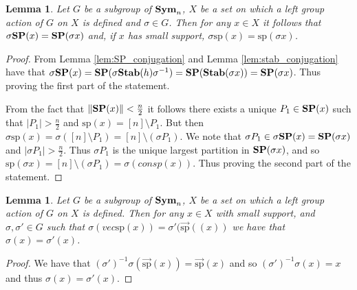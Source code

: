 \documentclass[12pt]{report}
\newtheorem{lem}[thm]{Lemma} \newtheorem{prop}[thm]{Proposition}
\newcommand{\stab}{\text{\textbf{Stab}}}
\newcommand{\sym}{\text{\textbf{Sym}}}
\newcommand{\orb}{\text{\textbf{Orb}}}
\newcommand{\SP}{\text{\textbf{SP}}}
\newcommand{\consp}{\text{sp}}
\begin{document}
\begin{lem}
  \label{lem:support_mapping}
  Let $G $ be a subgroup of $\sym_n$, $X$ be a set on which a left group action
  of $G$ on $X$ is defined and $\sigma \in G$. Then for any $x \in X$ it follows
  that $\sigma \SP (x) = \SP (\sigma x)$ and, if $x$ has small support, $\sigma
  \consp (x) = \consp (\sigma x)$.
\end{lem}
\begin{proof}
  From Lemma \ref{lem:SP_conjugation} and Lemma \ref{lem:stab_conjugation} have
  that $\sigma \SP (x) = \SP(\sigma \stab(h) \sigma^{-1}) = \SP (\stab(\sigma
  x)) = \SP (\sigma x)$. Thus proving the first part of the statement.

  From the fact that $\| \SP(x) \| < \frac{n}{2}$ it follows there exists a
  unique $P_1 \in \SP(x)$ such that $\vert P_1 \vert > \frac{n}{2}$ and
  $\consp(x) = [n] \setminus P_1$. But then $\sigma \consp (x) = \sigma([n]
  \setminus P_1) = [n] \setminus (\sigma P_1)$. We note that $\sigma P_1 \in
  \sigma \SP (x) = \SP(\sigma x)$ and $\vert \sigma P_1 \vert > \frac{n}{2}$.
  Thus $\sigma P_1$ is the unique largest partition in $\SP(\sigma x)$, and so
  $\consp(\sigma x) = [n]\setminus (\sigma P_1) = \sigma (consp(x))$. Thus
  proving the second part of the statement.
\end{proof}

\begin{lem}
  Let $G$ be a subgroup of $\sym_n$, $X$ be a set on which a left group action
  of $G$ on $X$ is defined. Then for any $x \in X$ with small support, and
  $\sigma, \sigma' \in G$ such that $\sigma (vec{\consp}(x)) = \sigma'
  (\vec{\consp}((x))$ we have that $\sigma (x) = \sigma'(x)$.
\end{lem}
\begin{proof}
  We have that $(\sigma')^{-1}\sigma(\vec{\consp}(x)) = \vec{\consp}(x)$ and so
  $(\sigma')^{-1} \sigma (x) = x$ and thus $\sigma (x) = \sigma' (x)$.
\end{proof}


\end{document}
